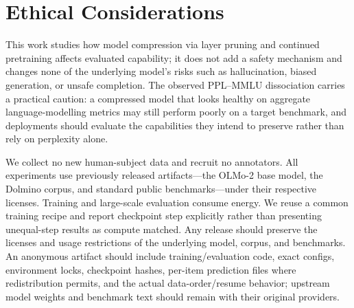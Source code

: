 \section*{Ethical Considerations}
This work studies how model compression via layer pruning and continued
pretraining affects evaluated capability; it does not add a safety mechanism and
changes none of the underlying model's risks such as hallucination, biased
generation, or unsafe completion. The observed PPL--MMLU dissociation carries a
practical caution: a compressed model that looks healthy on aggregate
language-modelling metrics may still perform poorly on a target benchmark, and
deployments should evaluate the capabilities they intend to preserve rather than
rely on perplexity alone.

We collect no new human-subject data and recruit no annotators. All experiments
use previously released artifacts---the OLMo-2 base model, the Dolmino corpus, and
standard public benchmarks---under their respective licenses. Training and
large-scale evaluation consume energy. We reuse a common training recipe and
report checkpoint step explicitly rather than presenting unequal-step results as
compute matched. Any release should preserve the licenses and usage restrictions
of the underlying model, corpus, and benchmarks. An anonymous artifact should
include training/evaluation code, exact configs, environment locks, checkpoint
hashes, per-item prediction files where redistribution permits, and the actual
data-order/resume behavior; upstream model weights and benchmark text should
remain with their original providers.
